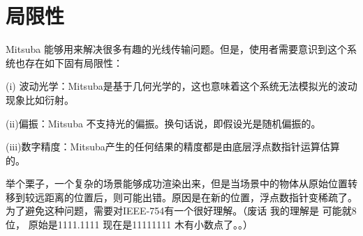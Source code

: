 \chapter{局限性}
Mitsuba 能够用来解决很多有趣的光线传输问题。但是，使用者需要意识到这个系统也存在如下固有局限性：
\par 
(i) 波动光学：Mitsuba是基于几何光学的，这也意味着这个系统无法模拟光的波动现象比如衍射。
\par 
(ii)偏振：Mitsuba 不支持光的偏振。换句话说，即假设光是随机偏振的。
\par 
(iii)数字精度：Mitsuba产生的任何结果的精度都是由底层浮点数指针运算估算的。
\par 
举个栗子，一个复杂的场景能够成功渲染出来，但是当场景中的物体从原始位置转移到较远距离的位置后，则可能出错。原因是在新的位置，浮点数指针变稀疏了。为了避免这种问题，需要对IEEE-754有一个很好理解。（废话 我的理解是 可能就8位， 原始是1111.1111 现在是11111111 木有小数点了。。）
